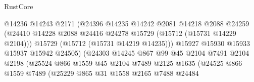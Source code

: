 \begin{lexlean}{RustCore}
\begin{coremodule}
                                        @14236
                                        @14243
                                        @2171
                                        (@24396
                                          @14235
                                          @14242
                                          @2081
                                          @14218
                                          @2088
                                          @24259
                                          (@24410
                                            @14228
                                            @2088
                                            @24416
                                            @24278
                                            @15729
                                            (@15712 (@15731 @14229 @2104)))
                                          @15729
                                          (@15712 (@15731 @14219 @14235)))
                                        @15927
                                        @15930
                                        @15933
                                        @15937
                                        @15942
                                        @24505)
                                      (@24303
                                        @14245
                                        @867
                                        @99
                                        @45
                                        @2104
                                        @7491
                                        @2104
                                        @2198
                                        (@25524
                                          @866
                                          @1559
                                          @45
                                          @2104
                                          @7489
                                          @2125
                                          @1635
                                          (@24525
                                            @866
                                            @1559
                                            @7489
                                            (@25229
                                              @865
                                              @31
                                              @1558
                                              @2165
                                              @7488
                                              @24484

\end{coremodule}
\end{lexlean}
